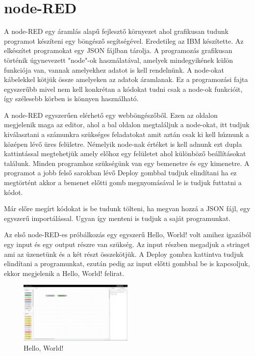 \documentclass[a4paper,12pt,oneside]{report}
\begin{document}
\chapter{node-RED}

A node-RED egy áramlás alapű fejlesztő környezet ahol grafikusan tudunk programot készíteni egy böngésző segítségével. Eredetileg az IBM
készítette. Az elkészítet programokat egy JSON fájlban tárolja. A programozás grafikusan történik úgynevezett "node"-ok használatával,
amelyek mindegyikének külön funkciója van, vannak amelyekhez adatot is kell rendelnünk. A node-okat kábelekkel kötjük össze amelyeken az
adatok áramlanak. Ez a programozási fajta egyszerűbb mivel nem kell konkrétan a kódokat tudni csak a node-ok funkcióit, így
szélesebb körben is könnyen használható.

A node-RED egyszerűen elérhető egy webböngészőből. Ezen az oldalon megjelenik maga az editor, ahol a bal oldalon megtaláljuk a 
node-okat, itt tudjuk kiválasztani a számunkra szükséges feladatokat amit aztán csak ki kell húznunk a középen lévő üres felületre.
Némelyik node-nak értéket is kell adnunk ezt dupla kattintással megtehetjük amely előhoz egy felületet ahol különböző beállításokat
találunk. Minden programhoz szükségünk van egy bemenetre és egy kimenetre. A programot a jobb felső sarokban lévő Deploy gombbal
tudjuk elindítani ha ez megtörtént akkor a bemenet előtti gomb megnyomásával le is tudjuk futtatni a kódot.

Már előre megírt kódokat is be tudunk tölteni, ha megvan hozzá a JSON fájl, egy egyszerű importálással. Ugyan így menteni is tudjuk
a saját programunkat.

Az első node-RED-es próbálkozás egy egyszerű Hello, World! volt amihez igazából egy input és egy output részre van szükség.
Az input részben megadjuk a stringet ami az üzenetünk és a két részt összekötjük. A Deploy gombra kattintva tudjuk elindítani a
programunkat, ezután pedig az input előtti gombbal be is kapcsoljuk, ekkor megjelenik a Hello, World! felirat.

\begin{figure}[htbp]
	\centering
	\includegraphics[width=0.5\textwidth]{fig/Hello, World.png}
	\caption{Hello, World!}
	\label{fig-Hello, World}
\end{figure}
\end{document}
